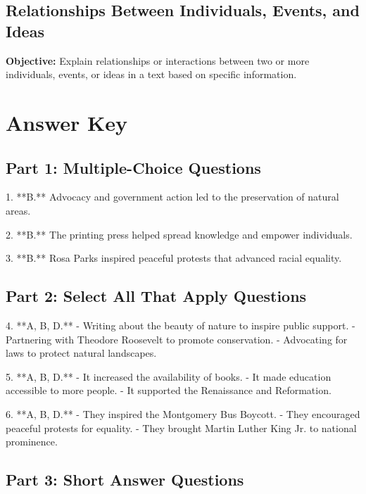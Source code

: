 \documentclass[12pt]{article}
\begin{document}
\subsection*{Relationships Between Individuals, Events, and Ideas}
\onehalfspacing

\begin{tcolorbox}[colframe=black!40, colback=gray!0, title=Learning Objective]
\textbf{Objective:} Explain relationships or interactions between two or more individuals, events, or ideas in a text based on specific information.
\end{tcolorbox}


\section*{Answer Key}

\subsection*{Part 1: Multiple-Choice Questions}

1. **B.** Advocacy and government action led to the preservation of natural areas.

2. **B.** The printing press helped spread knowledge and empower individuals.

3. **B.** Rosa Parks inspired peaceful protests that advanced racial equality.

\subsection*{Part 2: Select All That Apply Questions}

4. **A, B, D.**  
   - Writing about the beauty of nature to inspire public support.  
   - Partnering with Theodore Roosevelt to promote conservation.  
   - Advocating for laws to protect natural landscapes.  

5. **A, B, D.**  
   - It increased the availability of books.  
   - It made education accessible to more people.  
   - It supported the Renaissance and Reformation.  

6. **A, B, D.**  
   - They inspired the Montgomery Bus Boycott.  
   - They encouraged peaceful protests for equality.  
   - They brought Martin Luther King Jr. to national prominence.  

\subsection*{Part 3: Short Answer Questions}
\end{document}
